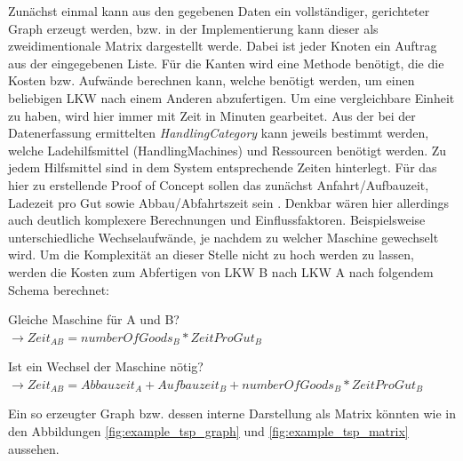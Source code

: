 Zunächst einmal kann aus den gegebenen Daten ein vollständiger, gerichteter Graph erzeugt werden, bzw. in der Implementierung kann dieser als zweidimentionale Matrix dargestellt werde. Dabei ist jeder Knoten ein Auftrag aus der eingegebenen Liste. Für die Kanten wird eine Methode benötigt, die die Kosten bzw. Aufwände berechnen kann, welche benötigt werden, um einen beliebigen LKW nach einem Anderen abzufertigen. Um eine vergleichbare Einheit zu haben, wird hier immer mit Zeit in Minuten gearbeitet. Aus der bei der Datenerfassung ermittelten \textit{HandlingCategory} kann jeweils bestimmt werden, welche Ladehilfsmittel (HandlingMachines) und Ressourcen benötigt werden. Zu jedem Hilfsmittel sind in dem System entsprechende Zeiten hinterlegt. Für das hier zu erstellende Proof of Concept sollen das zunächst Anfahrt/Aufbauzeit, Ladezeit pro Gut sowie Abbau/Abfahrtszeit sein . Denkbar wären hier allerdings auch deutlich komplexere Berechnungen und Einflussfaktoren. Beispielsweise unterschiedliche Wechselaufwände, je nachdem zu welcher Maschine gewechselt wird. Um die Komplexität an dieser Stelle nicht zu hoch werden zu lassen, werden die Kosten zum Abfertigen von LKW B nach LKW A nach folgendem Schema berechnet:

Gleiche Maschine für A und B?\\
$\rightarrow Zeit_{AB} = numberOfGoods_B * ZeitProGut_B$

Ist ein Wechsel der Maschine nötig?\\
$\rightarrow Zeit_{AB} = Abbauzeit_A + Aufbauzeit_B + numberOfGoods_B * ZeitProGut_B$

Ein so erzeugter Graph bzw. dessen interne Darstellung als Matrix könnten wie in den Abbildungen \ref{fig:example_tsp_graph} und \ref{fig:example_tsp_matrix} aussehen.

